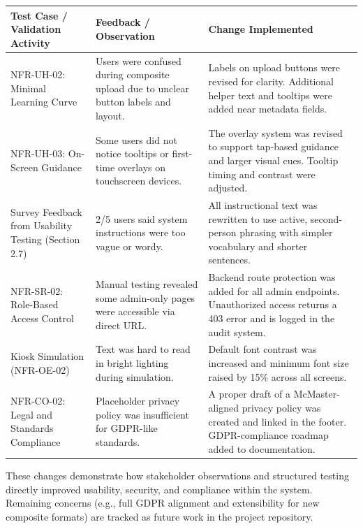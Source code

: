\documentclass[12pt, titlepage]{article}
\begin{document}
\begin{longtable}{|p{4.5cm}|p{5.5cm}|p{5.5cm}|}
\hline
\textbf{Test Case / Validation Activity} & \textbf{Feedback / Observation} & \textbf{Change Implemented} \\
\hline

NFR-UH-02: Minimal Learning Curve & Users were confused during composite upload due to unclear button labels and layout. & Labels on upload buttons were revised for clarity. Additional helper text and tooltips were added near metadata fields. \\
\hline

NFR-UH-03: On-Screen Guidance & Some users did not notice tooltips or first-time overlays on touchscreen devices. & The overlay system was revised to support tap-based guidance and larger visual cues. Tooltip timing and contrast were adjusted. \\
\hline

Survey Feedback from Usability Testing (Section 2.7) & 2/5 users said system instructions were too vague or wordy. & All instructional text was rewritten to use active, second-person phrasing with simpler vocabulary and shorter sentences. \\
\hline

NFR-SR-02: Role-Based Access Control & Manual testing revealed some admin-only pages were accessible via direct URL. & Backend route protection was added for all admin endpoints. Unauthorized access returns a 403 error and is logged in the audit system. \\
\hline

Kiosk Simulation (NFR-OE-02) & Text was hard to read in bright lighting during simulation. & Default font contrast was increased and minimum font size raised by 15\% across all screens. \\
\hline

NFR-CO-02: Legal and Standards Compliance & Placeholder privacy policy was insufficient for GDPR-like standards. & A proper draft of a McMaster-aligned privacy policy was created and linked in the footer. GDPR-compliance roadmap added to documentation. \\
\hline

\end{longtable}

These changes demonstrate how stakeholder observations and structured testing directly improved usability, security, and compliance within the system. Remaining concerns (e.g., full GDPR alignment and extensibility for new composite formats) are tracked as future work in the project repository.
\end{document}
